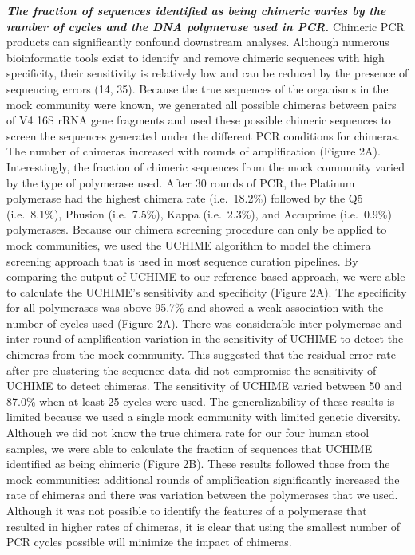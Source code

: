 \documentclass[11pt,]{article}
\begin{document}
\textbf{\emph{The fraction of sequences identified as being chimeric
varies by the number of cycles and the DNA polymerase used in PCR.}}
Chimeric PCR products can significantly confound downstream analyses.
Although numerous bioinformatic tools exist to identify and remove
chimeric sequences with high specificity, their sensitivity is
relatively low and can be reduced by the presence of sequencing errors
(14, 35). Because the true sequences of the organisms in the mock
community were known, we generated all possible chimeras between pairs
of V4 16S rRNA gene fragments and used these possible chimeric sequences
to screen the sequences generated under the different PCR conditions for
chimeras. The number of chimeras increased with rounds of amplification
(Figure 2A). Interestingly, the fraction of chimeric sequences from the
mock community varied by the type of polymerase used. After 30 rounds of
PCR, the Platinum polymerase had the highest chimera rate (i.e.~18.2\%)
followed by the Q5 (i.e.~8.1\%), Phusion (i.e.~7.5\%), Kappa
(i.e.~2.3\%), and Accuprime (i.e.~0.9\%) polymerases. Because our
chimera screening procedure can only be applied to mock communities, we
used the UCHIME algorithm to model the chimera screening approach that
is used in most sequence curation pipelines. By comparing the output of
UCHIME to our reference-based approach, we were able to calculate the
UCHIME's sensitivity and specificity (Figure 2A). The specificity for
all polymerases was above 95.7\% and showed a weak association with the
number of cycles used (Figure 2A). There was considerable
inter-polymerase and inter-round of amplification variation in the
sensitivity of UCHIME to detect the chimeras from the mock community.
This suggested that the residual error rate after pre-clustering the
sequence data did not compromise the sensitivity of UCHIME to detect
chimeras. The sensitivity of UCHIME varied between 50 and 87.0\% when at
least 25 cycles were used. The generalizability of these results is
limited because we used a single mock community with limited genetic
diversity. Although we did not know the true chimera rate for our four
human stool samples, we were able to calculate the fraction of sequences
that UCHIME identified as being chimeric (Figure 2B). These results
followed those from the mock communities: additional rounds of
amplification significantly increased the rate of chimeras and there was
variation between the polymerases that we used. Although it was not
possible to identify the features of a polymerase that resulted in
higher rates of chimeras, it is clear that using the smallest number of
PCR cycles possible will minimize the impact of chimeras.
\end{document}
